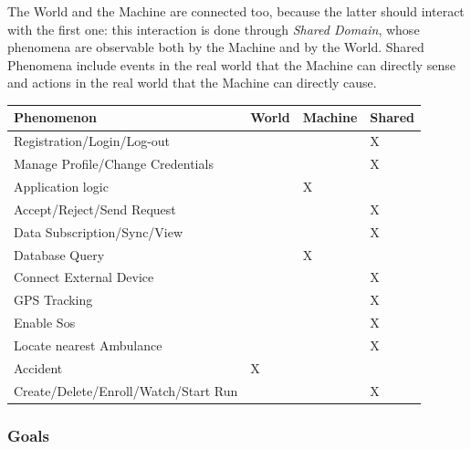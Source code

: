 \documentclass[a4paper]{article}
\begin{document}
        The World and the Machine are connected too, because the latter should interact with the first one: this interaction is done through \textit{Shared Domain}, whose phenomena are observable both by the Machine and by the World. Shared Phenomena include events in the real world that the Machine can directly sense and actions in the real world that the Machine can directly cause.
        \newpage
        \begin{table}[!htpb]
        \centering
        \begin{tabular}{|l|l|l|l|}
        \hline
         \textbf{Phenomenon} & \textbf{World} & \textbf{Machine} & \textbf{Shared}\\ \hline
         Registration/Login/Log-out & & & X \\ \hline
         Manage Profile/Change Credentials & & & X \\ \hline
         Application logic & & X & \\ \hline
         Accept/Reject/Send Request & & & X \\ \hline
         Data Subscription/Sync/View & & & X \\ \hline
         Database Query & & X & \\ \hline
         Connect External Device & & & X \\ \hline
         GPS Tracking & & & X \\ \hline
         Enable Sos & & & X \\ \hline
         Locate nearest Ambulance & & & X \\ \hline
         Accident & X & & \\ \hline
         Create/Delete/Enroll/Watch/Start Run & & & X \\ \hline
        \end{tabular}
        \end{table}
        
        \subsubsection{Goals}
        
\end{document}

